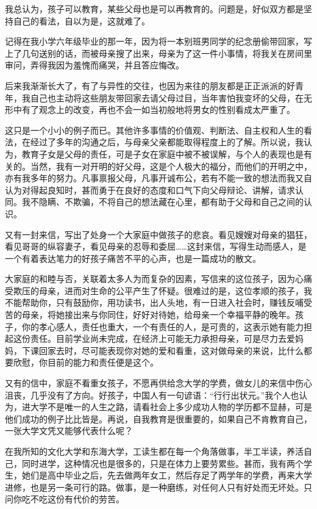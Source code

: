 \par 我总认为，孩子可以教育，某些父母也是可以再教育的。问题是，好似双方都是坚持自己的看法，自以为是，这就难了。
\par 记得在我小学六年级毕业的那一年，因为将一本别班男同学的纪念册偷带回家，写上了几句送别的话，而被母亲搜了出来，母亲为了这一件小事情，将我关在房间里审问，弄得我因为羞愧而痛哭，并且答应悔改。
\par 后来我渐渐长大了，有了与异性的交往，也因为来往的朋友都是正正派派的好青年，我自己也主动将这些朋友带回家去请父母过目，当年害怕我变坏的父母，在无形中有了观念上的改变，再也不会一如当初般地将男女的性别看成太严重了。
\par 这只是一个小小的例子而已。其他许多事情的价值观、判断法、自主权和人生的看法，在经过了多年的沟通之后，与母亲父亲都能取得程度上的了解。所以说，我认为，教育子女是父母的责任，可是子女在家庭中被不被误解，与个人的表现也是有关的。当然，我有一对开明的好父母，这是个人极大的福分，而他们的开明之中，亦有我多年的努力。凡事禀报父母，凡事开诚布公，若有不能一致的想法而我又自认为对得起良知时，甚而勇于在良好的态度和口气下向父母辩论、讲解，请求认同。我不隐瞒、不欺骗，不将自己的想法藏在心里，都有助于父母和自己之间的认识。
\par 又有一封来信，写出了处身一个大家庭中做孩子的悲哀。看见嫂嫂对母亲的猖狂，看见哥哥的纵容妻子，看见母亲的忍辱和委屈……这封来信，写得生动而感人，是一个有着表达笔力的好孩子痛苦不平的心声，也是一篇成功的散文。
\par 大家庭的和睦与否，关联着太多人为而复杂的因素，写信来的这位孩子，因为心痛受欺压的母亲，进而对生命的公平产生了怀疑。很难过的是，这位孝顺的孩子，我不能帮助你，只有鼓励你，用功读书，出人头地，有一日进入社会时，赚钱反哺受苦的母亲，将她接出来与你同住，好好对待她，给母亲一个幸福平静的晚年。孩子，你的孝心感人，责任也重大，一个有责任的人，是可贵的，这表示她有能力担起这份责任。目前学业尚未完成，在经济上可能无力承担母亲，可是尽力去爱妈妈，下课回家去时，尽可能表现你对她的爱和看重，这对做母亲的来说，比什么都要欣慰，你目前的能力和责任便是这个。
\par 又有的信中，家庭不看重女孩子，不愿再供给念大学的学费，做女儿的来信中伤心沮丧，几乎没有了方向。好孩子，中国人有一句谚语：“行行出状元。”我个人也认为，进大学不是唯一的人生之路，请看社会上多少成功人物的学历都不显赫，可是他们成功的例子比比皆是。再说，自我教育是很重要的，如果自己不肯教育自己，一张大学文凭又能够代表什么呢？
\par 在我所知的文化大学和东海大学，工读生都在每一个角落做事，半工半读，养活自己，同时进学，这种情况也是很多的，只是在体力上要劳累些。甚而，我有两个学生，她们是高中毕业之后，先去做两年女工，然后存足了两学年的学费，再来大学进修，也是另一条可行的路。做事，是一种磨练，对任何人只有好处而无坏处。只问你吃不吃这份有代价的劳苦。

